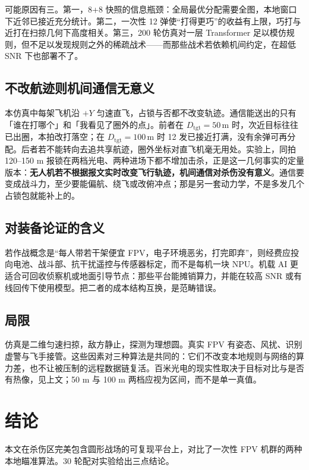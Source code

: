 \documentclass[12pt,a4paper]{article}
\begin{document}
可能原因有三。第一，8+8 快照的信息瓶颈：全局最优分配需要全图，本地窗口下近邻已接近充分统计。第二，一次性 12 弹使“打得更巧”的收益有上限，巧打与近打在扫掠几何下高度相关。第三，200 轮仿真对一层 Transformer 足以模仿规则，但不足以发现规则之外的稀疏战术——而那些战术若依赖机间约定，在超低 SNR 下也部署不了。

\subsection{不改航迹则机间通信无意义}

本仿真中每架飞机沿 $+Y$ 匀速直飞，占锁与否都不改变轨迹。通信能送出的只有「谁在打哪个」和「我看见了圈外的点」。前者在 $D_{\mathrm{tgt}}=50\,\mathrm{m}$ 时，次近目标往往已出圈，本拍改打落空；在 $D_{\mathrm{tgt}}=100\,\mathrm{m}$ 时 12 发已接近打满，没有余弹可再分配。后者若不能转向去追共享航迹，圈外坐标对直飞机毫无用处。实验上，同拍 120--150 m 报锁在两档光电、两种进场下都不增加击杀，正是这一几何事实的定量版本：\textbf{无人机若不根据报文实时改变飞行轨迹，机间通信对杀伤没有意义}。通信要变成战斗力，至少要能偏航、绕飞或改俯冲点；那是另一套动力学，不是多发几个占锁包就能补上的。

\subsection{对装备论证的含义}

若作战概念是“每人带若干架便宜 FPV，电子环境恶劣，打完即弃”，则经费应投向电池、战斗部、抗干扰遥控与传感器标定，而不是每机一块 NPU。机载 AI 更适合可回收侦察机或地面引导节点：那些平台能摊销算力，并能在较高 SNR 或有线回传下使用模型。把二者的成本结构互换，是范畴错误。

\subsection{局限}

仿真是二维匀速扫掠，敌方静止，探测为理想圆。真实 FPV 有姿态、风扰、识别虚警与飞手接管。这些因素对三种算法是共同的：它们不改变本地规则与网络的算力差，也不让被压制的远程数据链复活。百米光电的现实性取决于目标对比与是否有热像，见上文；50 m 与 100 m 两档应视为区间，而不是单一真值。

\section{结论}

本文在杀伤区完美包含圆形战场的可复现平台上，对比了一次性 FPV 机群的两种本地瞄准算法。30 轮配对实验给出三点结论。
\end{document}
